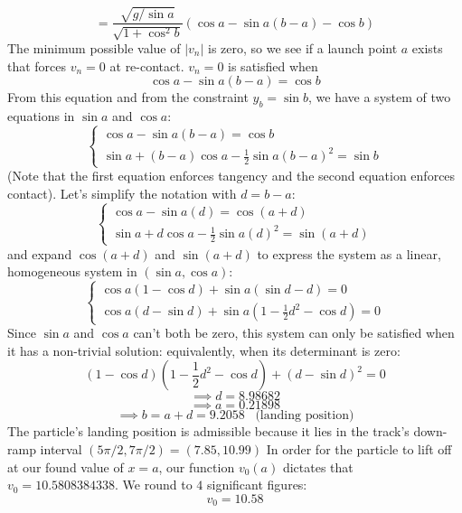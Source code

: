 \documentclass[12pt]{article}
\begin{document}
{$$ = \frac{\sqrt{g / \sin a}}{\sqrt{1 + \cos^2 b}} (\cos a - \sin a (b-a) - \cos b)$$
The minimum possible value of $|v_n|$ is zero, so we see if a launch point $a$ exists that forces $v_n = 0$ at re-contact. $v_n = 0$ is satisfied when
$$\cos a - \sin a (b-a) = \cos{b}$$
From this equation and from the constraint $y_b = \sin{b}$, we have a system of two equations in $\sin{a}$ and $\cos{a}$:
$$\begin{cases}
\cos{a} - \sin{a} (b - a) = \cos {b} \\
\sin{a} + (b-a)\cos{a} - \frac{1}{2} \sin {a} (b-a)^2 = \sin {b}
\end{cases}$$
(Note that the first equation enforces tangency and the second equation enforces contact). Let's simplify the notation with $d = b-a$:
$$\begin{cases}
\cos{a} - \sin{a} (d) = \cos {(a+d)} \\
\sin{a} + d\cos{a} - \frac{1}{2} \sin {a} (d)^2 = \sin {(a+d)}
\end{cases}$$
and expand $\cos{(a + d)}$ and $\sin{(a+d)}$ to express the system as a linear, homogeneous system in $(\sin{a}, \cos{a})$:
$$\begin{cases}
\cos{a}(1 - \cos{d}) + \sin a (\sin d -d) = 0 \\
\cos{a}(d - \sin{d}) + \sin a (1 - \frac{1}{2} d^2 - \cos{d}) = 0
\end{cases}$$
Since $\sin a $ and $\cos a$ can't both be zero, this system can only be satisfied when it has a non-trivial solution: equivalently, when its determinant is zero:
$$(1 - \cos d)(1 - \frac{1}{2} d^2 - \cos d) + (d - \sin d)^2 = 0$$
$$\implies d = 8.98682$$
$$\implies a = 0.21898$$
$$\implies b = a + d = 9.2058 \;\;\; \text{(landing position)}$$
The particle's landing position is admissible because it lies in the track's down-ramp interval $(5\pi/2, 7\pi/2) = (7.85, 10.99)$
In order for the particle to lift off at our found value of $x=a$, our function $v_0(a)$ dictates that $v_0 = 10.5808384338$. We round to $4$ significant figures: $$\boxed{v_0 = 10.58}$$
}
\end{document}
